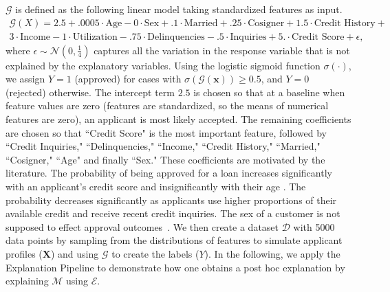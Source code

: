 \documentclass[mnsc,blindrev]{informs3}
\begin{document}
    $\mathcal{G}$ is defined as the following linear model taking standardized features as input. 
    \begin{equation}
    \label{eqn:gt}
    \begin{split}
    \mathcal{G}(X) =2.5 +.0005\cdot\text{Age} -0\cdot\text{Sex} +.1 \cdot \text{Married} + .25\cdot \text{Cosigner} + 1.5 \cdot \text{Credit History} + \\   3 \cdot \text{Income} - 1\cdot\text{Utilization} -.75 \cdot \text{Delinquencies} - .5\cdot\text{Inquiries} + 5.\cdot\text{Credit Score} + \epsilon,
    \end{split}
    \end{equation}
    \noindent where $\epsilon \sim \mathcal{N}(0,\frac{1}{4})$ captures all the variation in the response variable that is not explained by the explanatory variables.
    Using the logistic sigmoid function $\sigma(\cdot)$, we assign $Y = 1$ (approved) for cases with $\sigma(\mathcal{G}(\mathbf{x}))\geq 0.5$, and $Y = 0$ (rejected) otherwise. The intercept term $2.5$ is chosen so that at a baseline when feature values are zero (features are standardized, so the means of numerical features are zero), an applicant is most likely accepted. The remaining coefficients are chosen so that ``Credit Score" is the most important feature, followed by ``Credit Inquiries," ``Delinquencies," ``Income," ``Credit History," ``Married," ``Cosigner," ``Age" and finally ``Sex." These coefficients are motivated by the literature. The probability of being approved for a loan increases significantly with an applicant's credit score and insignificantly with their age \citep{cfb_age}. The probability decreases significantly as applicants use higher proportions of their available credit and receive recent credit inquiries. The sex of a customer is not supposed to effect approval outcomes~\citep{Calcagnini2014}. 
   We then create a dataset $\mathcal{D}$ with 5000 data points by sampling from the distributions of features to simulate applicant profiles ($\mathbf{X}$) and using $\mathcal{G}$ to create the labels ($Y$).  
   In the following, we apply the Explanation Pipeline to demonstrate how one obtains a post hoc explanation by explaining $\mathcal{M}$ using $\mathcal{E}$. 
\end{document}
